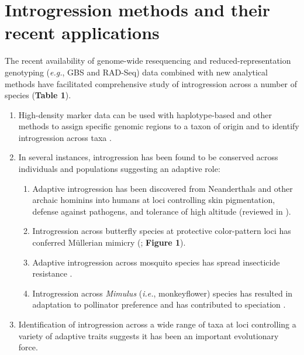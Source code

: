 \documentclass[11pt]{article}
\begin{document}
\section*{Introgression methods and their recent applications}
The recent availability of genome-wide resequencing and reduced-representation genotyping (\emph{e.g.}, GBS and RAD-Seq) data combined with new analytical methods have facilitated comprehensive study of introgression across a number of species (\textbf{Table 1}).
\begin{enumerate}
\item{High-density marker data can be used with haplotype-based and other methods to assign specific genomic regions to a taxon of origin and to identify introgression across taxa \cite{Martin2015,Price2009,Lawson2012}.}
\item{In several instances, introgression has been found to be conserved across individuals and populations suggesting an adaptive role:}
	\begin{enumerate}
	\item{Adaptive introgression has been discovered from Neanderthals and other archaic hominins into humans at loci controlling skin pigmentation, defense against pathogens, and tolerance of high altitude (reviewed in \cite{Racimo2015}}).
	\item{Introgression across butterfly species at protective color-pattern loci has conferred M\"{u}llerian mimicry (\cite{Heliconius2012}; \textbf{Figure 1})}.
	\item{Adaptive introgression across mosquito species has spread insecticide resistance \cite{Norris2015}}.
	\item{Introgression across \emph{Mimulus} (\emph{i.e.}, monkeyflower) species has resulted in adaptation to pollinator preference and has contributed to speciation \cite{Stankowski2015}}.
	\end{enumerate}
\item{Identification of introgression across a wide range of taxa at loci controlling a variety of adaptive traits suggests it has been an important evolutionary force.}
\end{enumerate}


\end{document}
